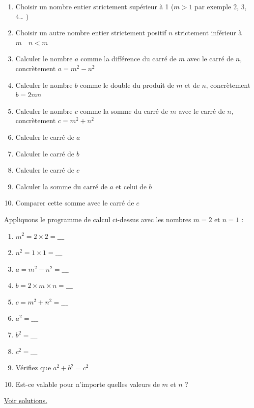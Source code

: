 \documentclass[11pt]{article}
\begin{document}
\begin{enumerate}
\item Choisir un nombre entier strictement supérieur à 1 (\(m > 1\) par
exemple 2, 3, 4\dots{} )
\item Choisir un autre nombre entier strictement positif \(n\)
strictement inférieur à \(m\quad n < m\)
\item Calculer le nombre \(a\) comme la différence du carré de \(m\) avec
le carré de \(n\), concrètement \(a = m^2 - n^2\)
\item Calculer le nombre \(b\) comme le double du produit de \(m\) et de
\(n\), concrètement \(b = 2mn\)
\item Calculer le nombre \(c\) comme la somme du carré de \(m\) avec le
carré de \(n\), concrètement \(c = m^2 + n^2\)
\item Calculer le carré de \(a\)
\item Calculer le carré de \(b\)
\item Calculer le carré de \(c\)
\item Calculer la somme du carré de \(a\) et celui de \(b\)
\item Comparer cette somme avec le carré de \(c\)
\end{enumerate}


\newpage

Appliquons le programme de calcul ci-dessus avec les nombres \(m = 2\)
et \(n = 1\) :



\begin{enumerate}
\item \(m^2 = 2 \times 2 =  \_\_\_\)
\item \(n^2 = 1 \times 1 = \_\_\_\)
\item \(a = m^2 - n^2 = \_\_\_\)
\item \(b = 2 \times m \times n = \_\_\_\)
\item \(c = m^2 + n^2 = \_\_\_\)
\item \(a^2 =  \_\_\_\)
\item \(b^2 =  \_\_\_\)
\item \(c^2 =  \_\_\_\)
\item Vérifiez que \(a^2 + b^2 = c^2\)
\item Est-ce valable pour n'importe quelles valeurs de \(m\) et \(n\) ?
\end{enumerate}



\hyperref[org2ddd170]{Voir solutions.}
\end{document}

